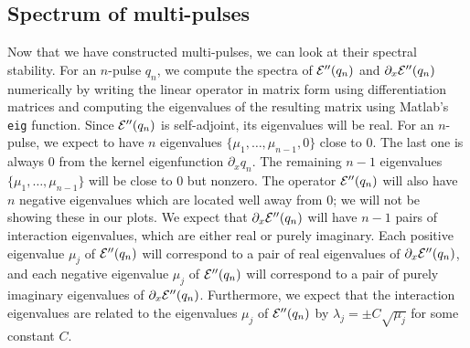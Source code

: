 \documentclass[thesis.tex]{subfiles}
\begin{document}
\subsection{Spectrum of multi-pulses}

Now that we have constructed multi-pulses, we can look at their spectral stability. For an $n$-pulse $q_n$, we compute the spectra of $\mathcal{E}''(q_n)$ and $\partial_x \mathcal{E}''(q_n)$ numerically by writing the linear operator in matrix form using differentiation matrices and computing the eigenvalues of the resulting matrix using Matlab's \texttt{eig} function. Since $\mathcal{E}''(q_n)$ is self-adjoint, its eigenvalues will be real. For an $n$-pulse, we expect to have $n$ eigenvalues $\{ \mu_1, \dots, \mu_{n-1}, 0 \}$ close to 0. The last one is always 0 from the kernel eigenfunction $\partial_x q_n$. The remaining $n-1$ eigenvalues $\{\mu_1, \dots, \mu_{n-1}\}$ will be close to 0 but nonzero. The operator $\mathcal{E}''(q_n)$ will also have $n$ negative eigenvalues which are located well away from 0; we will not be showing these in our plots. We expect that $\partial_x \mathcal{E}''(q_n)$ will have $n-1$ pairs of interaction eigenvalues, which are either real or purely imaginary. Each positive eigenvalue $\mu_j$ of $\mathcal{E}''(q_n)$ will correspond to a pair of real eigenvalues of $\partial_x \mathcal{E}''(q_n)$, and each negative eigenvalue $\mu_j$ of $\mathcal{E}''(q_n)$ will correspond to a pair of purely imaginary eigenvalues of $\partial_x \mathcal{E}''(q_n)$. Furthermore, we expect that the interaction eigenvalues are related to the eigenvalues $\mu_j$ of $\mathcal{E}''(q_n)$ by $\lambda_j = \pm C \sqrt{\mu_j}$ for some constant $C$.
\end{document}
